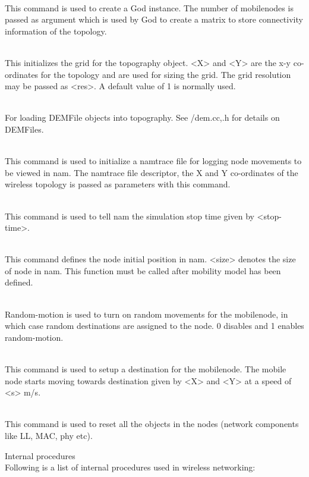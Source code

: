 {\begin{flushleft}
\\
This command is used to create a God instance. The number of mobilenodes
is passed as argument which is used by God to create a matrix to store
connectivity information of the topology.


\\
This initializes the grid for the topography object. <X> and <Y> are the x-y
co-ordinates for the topology and are used for sizing the grid. The grid
resolution may be passed as <res>. A default value of 1 is normally used.


\\
For loading DEMFile objects into topography. See \ns/dem.{cc,.h} for details on
DEMFiles.


\\
This command is used to initialize a namtrace file for logging node movements
to be viewed in nam. The namtrace file descriptor, the X and Y 
co-ordinates of the wireless topology is passed as parameters with
this command.


\\
This command is used to tell nam the simulation stop time given by <stop-time>.


\\
This command defines the node initial position in nam. <size> denotes the size
of node in nam. This function must be called after mobility model has been
defined.


\\
Random-motion is used to turn on random movements for the mobilenode, in which
case random destinations are assigned to the node. 0 disables and 1 enables
random-motion.


\\
This command is used to setup a destination for the mobilenode. The mobile
node starts moving towards destination given by <X> and <Y> at a speed of
<s> m/s.


\\
This command is used to reset all the objects in the nodes (network 
components like LL, MAC, phy etc).


Internal procedures\\
Following is a list of internal procedures used in wireless networking:


\end{flushleft}}
